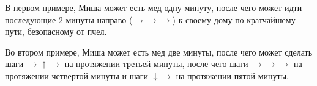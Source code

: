 В первом примере, Миша может есть мед одну минуту, после чего может идти последующие 2 минуты направо ($\rightarrow\rightarrow\rightarrow$) к своему дому по кратчайшему пути, безопасному от пчел.

Во втором примере, Миша может есть мед две минуты, после чего может сделать шаги $\rightarrow\uparrow\rightarrow$ на протяжении третьей минуты, после чего шаги $\rightarrow\rightarrow\rightarrow$ на протяжении четвертой минуты и шаги $\downarrow\rightarrow$ на протяжении пятой минуты.